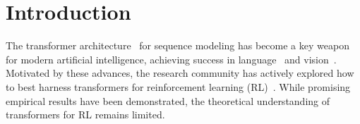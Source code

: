 \documentclass[10pt]{article}
\newcommand{\authnote}[2]{{\scriptsize $\ll$\textsf{#1 notes: #2}$\gg$}}
\newcommand{\authnote}[2]{}
\newcommand{\yub}[1]{{\color{red}\authnote{Yu}{#1}}}
\begin{document}
\begin{abstract}

\end{abstract}
% 
\section{Introduction}


The transformer architecture~\citep{vaswani2017attention} for sequence modeling has become a key weapon for modern artificial intelligence, achieving success in language~\citep{devlin2018bert,brown2020language,openai2023gpt} and vision~\citep{dosovitskiy2020image}. Motivated by these advances, the research community has actively explored how to best harness transformers for reinforcement learning (RL)~\citep{chen2021decision, janner2021offline, lee2022multi, reed2022generalist, laskin2022context, lee2023supervised,yang2023foundation}. While promising empirical results have been demonstrated, the theoretical understanding of transformers for RL remains limited. %
\end{document}
